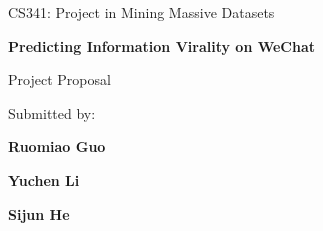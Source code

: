 \begin{titlepage}
\begin{center}
\large
\vspace{8cm}
        
\vspace{2.5cm}
CS341: Project in Mining Massive Datasets\par
\vspace{1cm}
\vspace{1cm}

\textbf{Predicting Information Virality on WeChat}\par
\vspace{2.5cm}

Project Proposal\par
\vspace{2.5cm}
Submitted by:\par 
\vspace{0.5cm}
\textbf{Ruomiao Guo }\par
\vspace{0.5cm}
\textbf{Yuchen Li }\par
\vspace{0.5cm}
\textbf{Sijun He }\par
\vspace{1.5cm}
\vfill                     
\end{center}
\end{titlepage}